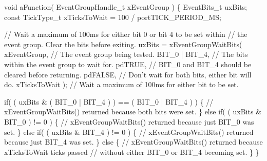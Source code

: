 \begin{DoxyPre}  void aFunction( EventGroupHandle\_t xEventGroup )
  \{
  EventBits\_t uxBits;
  const TickType\_t xTicksToWait = 100 / portTICK\_PERIOD\_MS;\end{DoxyPre}



\begin{DoxyPre}    // Wait a maximum of 100ms for either bit 0 or bit 4 to be set within
    // the event group.  Clear the bits before exiting.
    uxBits = xEventGroupWaitBits(
                xEventGroup,    // The event group being tested.
                BIT\_0 | BIT\_4,  // The bits within the event group to wait for.
                pdTRUE,         // BIT\_0 and BIT\_4 should be cleared before returning.
                pdFALSE,        // Don't wait for both bits, either bit will do.
                xTicksToWait ); // Wait a maximum of 100ms for either bit to be set.\end{DoxyPre}



\begin{DoxyPre}    if( ( uxBits \& ( BIT\_0 | BIT\_4 ) ) == ( BIT\_0 | BIT\_4 ) )
    \{
        // xEventGroupWaitBits() returned because both bits were set.
    \}
    else if( ( uxBits \& BIT\_0 ) != 0 )
    \{
        // xEventGroupWaitBits() returned because just BIT\_0 was set.
    \}
    else if( ( uxBits \& BIT\_4 ) != 0 )
    \{
        // xEventGroupWaitBits() returned because just BIT\_4 was set.
    \}
    else
    \{
        // xEventGroupWaitBits() returned because xTicksToWait ticks passed
        // without either BIT\_0 or BIT\_4 becoming set.
    \}
  \}
  \end{DoxyPre}
 